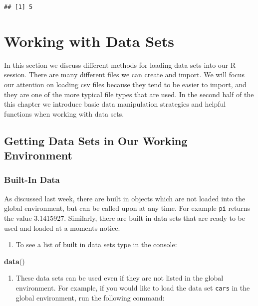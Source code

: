 \documentclass[
]{book}
\newenvironment{Shaded}{\begin{snugshade}}{\end{snugshade}}
\newcommand{\KeywordTok}[1]{\textcolor[rgb]{0.13,0.29,0.53}{\textbf{#1}}}
\newcommand{\NormalTok}[1]{#1}
\providecommand{\tightlist}{%
  \setlength{\itemsep}{0pt}\setlength{\parskip}{0pt}}
\begin{document}
\begin{verbatim}
## [1] 5
\end{verbatim}

\hypertarget{working-with-data-sets}{%
\chapter{Working with Data Sets}\label{working-with-data-sets}}

In this section we discuss different methods for loading data sets into our R session. There are many different files we can create and import. We will focus our attention on loading csv files because they tend to be easier to import, and they are one of the more typical file types that are used. In the second half of the this chapter we introduce basic data manipulation strategies and helpful functions when working with data sets.

\hypertarget{getting-data-sets-in-our-working-environment}{%
\section{Getting Data Sets in Our Working Environment}\label{getting-data-sets-in-our-working-environment}}

\hypertarget{built-in-data}{%
\subsection*{Built-In Data}\label{built-in-data}}

As discussed last week, there are built in objects which are not loaded into the global environment, but can be called upon at any time. For example \texttt{pi} returns the value 3.1415927. Similarly, there are built in data sets that are ready to be used and loaded at a moments notice.

\begin{enumerate}
\def\labelenumi{\arabic{enumi})}
\tightlist
\item
  To see a list of built in data sets type in the console:
\end{enumerate}

\begin{Shaded}
\begin{Highlighting}[]
\KeywordTok{data}\NormalTok{()}
\end{Highlighting}
\end{Shaded}

\begin{enumerate}
\def\labelenumi{\arabic{enumi})}
\setcounter{enumi}{1}
\tightlist
\item
  These data sets can be used even if they are not listed in the global environment. For example, if you would like to load the data set \texttt{cars} in the global environment, run the following command:
\end{enumerate}
\end{document}
